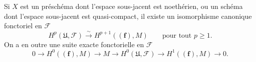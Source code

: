 \begin{proposition}[1.2.3]
\label{III.1.2.3-fr}
Si $X$ est un préschéma dont l'espace sous-jacent est noethérien, ou un
schéma dont l'espace sous-jacent est quasi-compact, il existe un isomorphisme
canonique fonctoriel en $\mathcal F$
\begin{equation}
\label{III.1.2.3.1-fr}
\tag{1.2.3.1}
H^p(\mathfrak U,\mathcal F)\xrightarrow{\sim}H^{p+1}((\mathbf f),M)
\qquad\text{pour tout }p\geq1.
\end{equation}
On a en outre une suite exacte fonctorielle en $\mathcal F$
\begin{equation}
\label{III.1.2.3.2-fr}
\tag{1.2.3.2}
0\longrightarrow H^0((\mathbf f),M)\longrightarrow M
\longrightarrow H^0(\mathfrak U,\mathcal F)
\longrightarrow H^1((\mathbf f),M)\longrightarrow0.
\end{equation}
\end{proposition}


